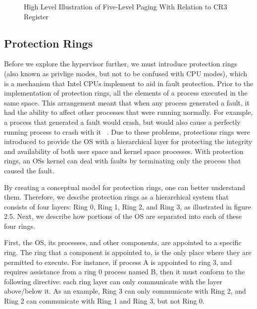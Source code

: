 \documentclass{report}
\begin{document}
\begin{spacing}{1.5}
\begin{figure}[ht]
    \centering
    \caption{High Level Illustration of Five-Level Paging With Relation to CR3 Register}
\end{figure}


\subsection{Protection Rings}

{\large
Before we explore the hypervisor further, we must introduce protection rings (also known as privlige modes, but not to be confused with CPU modes), which is a mechanism that Intel CPUs implement to aid in fault protection. Prior to the implementation of protection rings, all the elements of a process executed in the same space. This arrangement meant that when any process generated a fault, it had the ability to affect other processes that were running normally. For example, a process that generated a fault would crash, but would also cause a perfectly running process to crash with it ~\cite{Wiley2011}. Due to these problems, protections rings were introduced to provide the OS with a hierarchical layer for protecting the integrity and availability of both user space and kernel space processes. With protection rings, an OSs kernel can deal with faults by terminating only the process that caused the fault. 
\newline
}

{\large
\noindent By creating a conceptual model for protection rings, one can better understand them. Therefore, we descibe protection rings as a hierarchical system that consists of four layers: Ring 0, Ring 1, Ring 2, and Ring 3, as illustrated in figure 2.5. Next, we describe how portions of the OS are separated into each of these four rings.
\newline
}

{\large
\noindent First, the OS, its processes, and other components, are appointed to a specific ring. The ring that a component is appointed to, is the only place where they are permitted to execute. For instance, if process A is appointed to ring 3, and requires assistance from a ring 0 process named B, then it must conform to the following directive: each ring layer can only communicate with the layer above/below it. As an example, Ring 3 can only communicate with Ring 2, and Ring 2 can communicate with Ring 1 and Ring 3, but not Ring 0.
\newline
}


\end{spacing}
\end{document}
